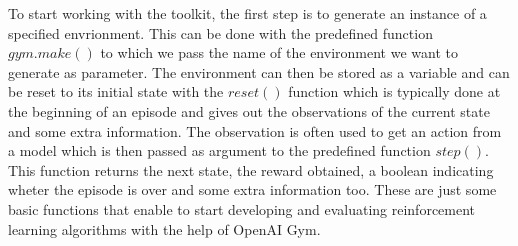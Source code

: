To start working with the toolkit, the first step is to generate an instance of a specified envrionment. This can be done with the predefined function $gym.make()$ to which we pass the name of the environment we want to generate as parameter. The environment can then be stored as a variable and can be reset to its initial state with the $reset()$ function which is typically done at the beginning of an episode and gives out the observations of the current state and some extra information. The observation is often used to get an action from a model which is then passed as argument to the predefined function $step()$. This function returns the next state, the reward obtained, a boolean indicating wheter the episode is over and some extra information too. These are just some basic functions that enable to start developing and evaluating reinforcement learning algorithms with the help of OpenAI Gym.







